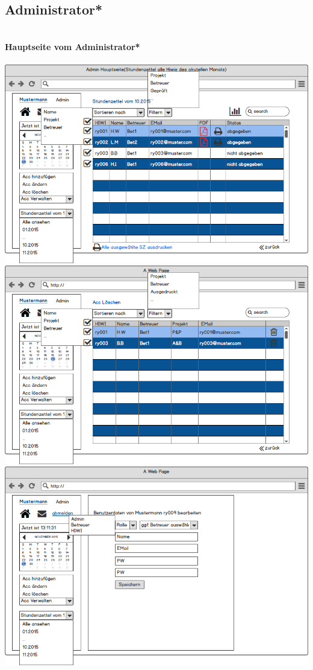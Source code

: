 \subsection{Administrator*}
\textbf{\\Hauptseite vom Administrator*}\\
\\
\includegraphics[width=\linewidth]{UI/Admin/Hauptseite.png}
\includegraphics[width=\linewidth]{UI/Admin/Accounts/Ubersicht.png}
\includegraphics[width=\linewidth]{UI/Admin/Accounts/Bearbeiten.png}
